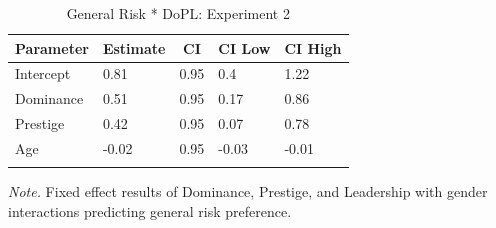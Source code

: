 \documentclass[
  donotrepeattitle,doc, 12pt, a4paper,floatsintext]{apa7}
\begin{document}
\begin{table}[h]

\begin{center}
\begin{threeparttable}

\caption{\label{tab:PNI Model DoPL Exp 2}General Risk * DoPL: Experiment 2}

\begin{tabular}{lllll}
\toprule
Parameter & \multicolumn{1}{c}{Estimate} & \multicolumn{1}{c}{CI} & \multicolumn{1}{c}{CI Low} & \multicolumn{1}{c}{CI High}\\
\midrule
Intercept & 0.81 & 0.95 & 0.4 & 1.22\\
Dominance & 0.51 & 0.95 & 0.17 & 0.86\\
Prestige & 0.42 & 0.95 & 0.07 & 0.78\\
Age & -0.02 & 0.95 & -0.03 & -0.01\\
\bottomrule
\addlinespace
\end{tabular}

\begin{tablenotes}[para]
\normalsize{\textit{Note.} Fixed effect results of Dominance, Prestige, and Leadership with gender interactions predicting general risk preference.}
\end{tablenotes}

\end{threeparttable}
\end{center}

\end{table}
\end{document}
